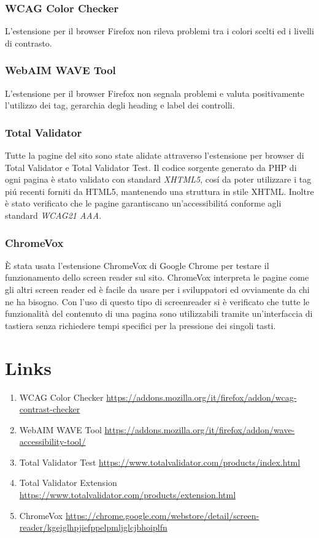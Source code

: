 \subsubsection{WCAG Color Checker}
L'estensione per il browser Firefox non rileva problemi tra i colori scelti ed i livelli di contrasto.

\subsubsection{WebAIM WAVE Tool}
L'estensione per il browser Firefox non segnala problemi e valuta positivamente l'utilizzo dei tag, gerarchia degli heading e label dei controlli.

\subsubsection{Total Validator}
Tutte la pagine del sito sono state alidate attraverso l'estensione per browser di Total Validator e Total Validator Test. Il codice sorgente generato da PHP di ogni pagina è stato validato con standard \textit{XHTML5}, cosí da poter utilizzare i tag piú recenti forniti da HTML5, mantenendo una struttura in stile XHTML. Inoltre è stato verificato che le pagine garantiscano un'accessibilitá conforme agli standard \textit{WCAG21 AAA}.
\subsubsection{ChromeVox}
È stata usata l'estensione ChromeVox di Google Chrome per testare il funzionamento dello screen reader sul sito. ChromeVox interpreta le pagine come gli altri screen reader ed è facile da usare per i sviluppatori ed ovviamente da chi ne ha bisogno. Con l'uso di questo tipo di screenreader si è verificato che tutte le funzionalità del contenuto di una pagina sono utilizzabili tramite un'interfaccia di tastiera senza richiedere tempi specifici per la pressione dei singoli tasti.


\vfill
\section*{Links}
\begin{enumerate}
	\item WCAG Color Checker \url{https://addons.mozilla.org/it/firefox/addon/wcag-contrast-checker} 
    \item WebAIM WAVE Tool \url{https://addons.mozilla.org/it/firefox/addon/wave-accessibility-tool/} 
    \item Total Validator Test \url{https://www.totalvalidator.com/products/index.html}
    \item Total Validator Extension \url{https://www.totalvalidator.com/products/extension.html}
    \item ChromeVox \url{https://chrome.google.com/webstore/detail/screen-reader/kgejglhpjiefppelpmljglcjbhoiplfn}
\end{enumerate}
    